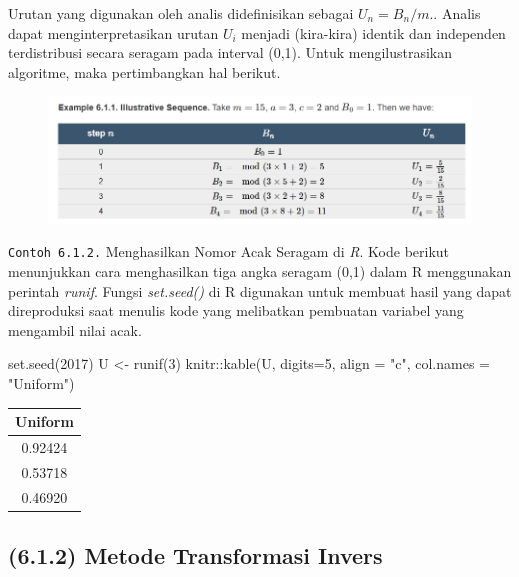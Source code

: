 \documentclass[
]{book}
\newenvironment{Shaded}{\begin{snugshade}}{\end{snugshade}}
\newcommand{\AttributeTok}[1]{\textcolor[rgb]{0.77,0.63,0.00}{#1}}
\newcommand{\DecValTok}[1]{\textcolor[rgb]{0.00,0.00,0.81}{#1}}
\newcommand{\FunctionTok}[1]{\textcolor[rgb]{0.00,0.00,0.00}{#1}}
\newcommand{\NormalTok}[1]{#1}
\newcommand{\OtherTok}[1]{\textcolor[rgb]{0.56,0.35,0.01}{#1}}
\newcommand{\SpecialCharTok}[1]{\textcolor[rgb]{0.00,0.00,0.00}{#1}}
\newcommand{\StringTok}[1]{\textcolor[rgb]{0.31,0.60,0.02}{#1}}
\begin{document}
Urutan yang digunakan oleh analis didefinisikan sebagai \(U_n=B_n/m.\). Analis dapat menginterpretasikan urutan \(U_{i}\) menjadi (kira-kira) identik dan independen terdistribusi secara seragam pada interval (0,1). Untuk mengilustrasikan algoritme, maka pertimbangkan hal berikut.

\begin{figure}

{\centering \includegraphics[width=1\linewidth]{images/enamsatu} 

}

\end{figure}

\texttt{Contoh\ 6.1.2.} Menghasilkan Nomor Acak Seragam di \emph{R}. Kode berikut menunjukkan cara menghasilkan tiga angka seragam (0,1) dalam R menggunakan perintah \emph{runif}. Fungsi \emph{set.seed()} di R digunakan untuk membuat hasil yang dapat direproduksi saat menulis kode yang melibatkan pembuatan variabel yang mengambil nilai acak.

\begin{Shaded}
\begin{Highlighting}[]
\FunctionTok{set.seed}\NormalTok{(}\DecValTok{2017}\NormalTok{)}
\NormalTok{U }\OtherTok{\textless{}{-}} \FunctionTok{runif}\NormalTok{(}\DecValTok{3}\NormalTok{)}
\NormalTok{knitr}\SpecialCharTok{::}\FunctionTok{kable}\NormalTok{(U, }\AttributeTok{digits=}\DecValTok{5}\NormalTok{, }\AttributeTok{align =} \StringTok{"c"}\NormalTok{, }\AttributeTok{col.names =} \StringTok{"Uniform"}\NormalTok{)}
\end{Highlighting}
\end{Shaded}

\begin{tabular}{c}
\hline
Uniform\\
\hline
0.92424\\
\hline
0.53718\\
\hline
0.46920\\
\hline
\end{tabular}

\hypertarget{metode-transformasi-invers}{%
\subsection{(6.1.2) Metode Transformasi Invers}\label{metode-transformasi-invers}}
\end{document}

